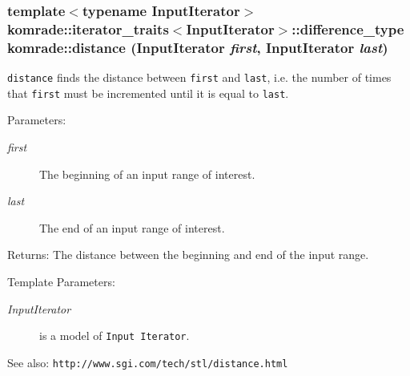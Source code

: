 \subsubsection[distance]{\setlength{\rightskip}{0pt plus 5cm}template$<$typename InputIterator$>$ komrade::iterator\_\-traits$<$InputIterator$>$::difference\_\-type komrade::distance (InputIterator {\em first}, \/  InputIterator {\em last})\hspace{0.3cm}{\tt  [inline]}}\label{group__counting_g5332f41a64fb61e7eca2d498210160a0}


{\tt distance} finds the distance between {\tt first} and {\tt last}, i.e. the number of times that {\tt first} must be incremented until it is equal to {\tt last}.

\begin{Desc}
\item[Parameters:]
\begin{description}
\item[{\em first}]The beginning of an input range of interest. \item[{\em last}]The end of an input range of interest. \end{description}
\end{Desc}
\begin{Desc}
\item[Returns:]The distance between the beginning and end of the input range.\end{Desc}
\begin{Desc}
\item[Template Parameters:]
\begin{description}
\item[{\em InputIterator}]is a model of {\tt Input Iterator}.\end{description}
\end{Desc}
\begin{Desc}
\item[See also:]{\tt http://www.sgi.com/tech/stl/distance.html} \end{Desc}
